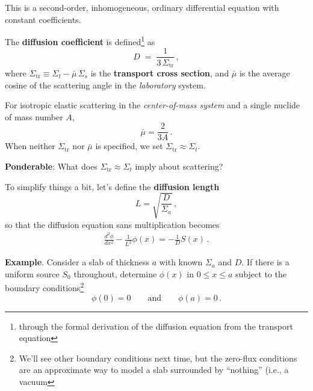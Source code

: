 \documentclass[compact]{ne630handout}
\begin{document}
\begin{handoutflow}
This is a second-order, inhomogeneous, ordinary differential equation with constant coefficients.

The {\bf diffusion coefficient} is defined\footnote{through the formal derivation of the diffusion equation from the transport equation} as
\begin{equation*}
 D \;=\; \frac{1}{3\,\Sigma_{\mathrm{tr}}} \, ,
\end{equation*}
where $\Sigma_{\mathrm{tr}} \equiv \Sigma_t - \bar{\mu}\,\Sigma_s$ is the {\bf transport cross section}, and
$\bar{\mu}$ is the average cosine of the scattering angle in the {\it laboratory} system.

For isotropic elastic scattering in the
{\it center-of-mass system} and a single
nuclide of mass number $A$,
\begin{equation*}
\tag{FNRP 2.X}
 \bar{\mu} = \frac{2}{3A} \, .
\end{equation*}
When neither $\Sigma_{\mathrm{tr}}$ nor $\bar{\mu}$ is specified, we set $\Sigma_{\mathrm{tr}} \approx \Sigma_{t}$.

{\bf Ponderable}: What does $\Sigma_{\mathrm{tr}} \approx \Sigma_{t}$ imply about scattering?

To simplify things a bit, let's define the {\bf diffusion length}
\begin{equation*}
 L = \sqrt{\frac{D}{\Sigma_a}} \, ,
\end{equation*}
so that the diffusion equation sans multiplication becomes
\begin{align*}
   \frac{d^2 \phi}{d x^2}
  - \frac{1}{L^2}\phi(x)
  = -\frac{1}{D} S(x) \, .
\end{align*}

{\bf Example}. Consider a slab of thickness $a$ with known $\Sigma_a$ and $D$. If there is a uniform source $S_0$ throughout, determine $\phi(x)$ in $0\le x\le a$ subject to
the boundary conditions\footnote{We'll see other boundary conditions next time, but the zero-flux conditions are an approximate way to model a slab surrounded by ``nothing'' (i.e., a vacuum}
\begin{equation*}
 \phi(0) = 0  \qquad \text{and} \qquad \phi(a) = 0 \, .
\end{equation*}


\end{handoutflow}
\end{document}

